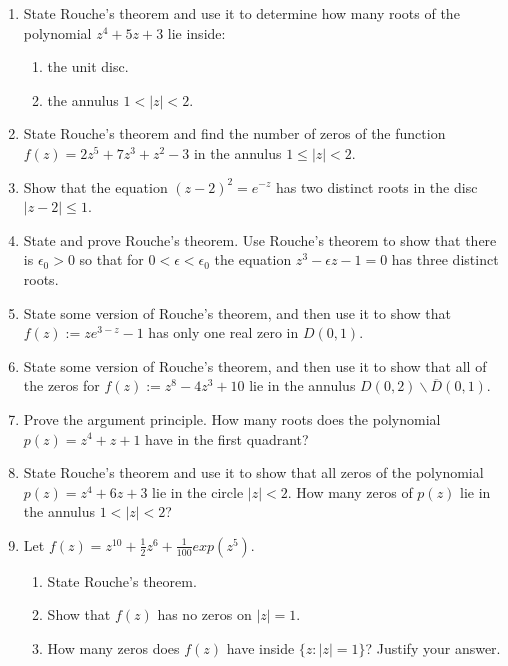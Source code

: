 \documentclass[a4paper,10pt]{article}
\begin{document}
\begin{enumerate}
	\item State Rouche's theorem and use it to determine how many roots of the polynomial $z^{4}+5z+3$ lie inside:
	\begin{enumerate}
		\item the unit disc.
		\item the annulus $1<|z|<2$.
	\end{enumerate}
	
	\item State Rouche's theorem and find the number of zeros of the function $f(z)=2z^{5}+7z^{3}+z^{2}-3$ in the annulus $1\le|z|<2$.
	
	\item Show that the equation $(z-2)^{2}=e^{-z}$ has two distinct roots in the disc $|z-2|\le1$.
	
	\item State and prove Rouche's theorem. Use Rouche's theorem to show that there is $\epsilon_{0}>0$ so that for $0<\epsilon<\epsilon_{0}$ the equation $z^{3}-\epsilon z-1=0$ has three distinct roots.
	
	\item State some version of Rouche's theorem, and then use it to show that $f(z):=ze^{3-z}-1$ has only one real zero in $D(0,1)$.
	
	\item State some version of Rouche's theorem, and then use it to show that all of the zeros for $f(z):=z^{8}-4z^{3}+10$ lie in the annulus $D(0,2)\backslash\overline{D}(0,1)$.
	
	\item Prove the argument principle. How many roots does the polynomial $p(z)=z^{4}+z+1$ have in the first quadrant?
	
	\item State Rouche's theorem and use it to show that all zeros of the polynomial $p(z)=z^{4}+6z+3$ lie in the circle $|z|<2$. How many zeros of $p(z)$ lie in the annulus $1<|z|<2$?
	
	\item Let $f(z)=z^{10}+\frac{1}{2}z^{6}+\frac{1}{100}exp(z^{5})$.
	\begin{enumerate}
		\item State Rouche's theorem.
		\item Show that $f(z)$ has no zeros on $|z|=1$.
		\item How many zeros does $f(z)$ have inside $\{z:|z|=1\}$? Justify your answer.
	\end{enumerate}
	

\end{enumerate}
\end{document}
